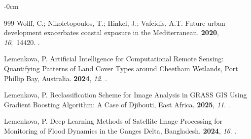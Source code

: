 \documentclass[coasts,article,accept,pdftex,moreauthors]{Definitions/mdpi}
\begin{document}
\begin{adjustwidth}{-\extralength}{0cm}
\begin{thebibliography}{999}
Wolff, C.; Nikoletopoulos, T.; Hinkel, J.; Vafeidis, A.T.
\newblock Future urban development exacerbates coastal exposure in the
  {Mediterranean}.
 {\bf 2020}, {\em 10},~14420.
.

Lemenkova, P.
\newblock Artificial Intelligence for Computational Remote Sensing: Quantifying
  Patterns of Land Cover Types around Cheetham Wetlands, Port Phillip Bay,
  Australia.
 {\bf 2024}, {\em 12}.
.

Lemenkova, P.
\newblock Reclassification Scheme for Image Analysis in GRASS GIS Using
  Gradient Boosting Algorithm: A Case of Djibouti, East Africa.
 {\bf 2025}, {\em 11}.
.

Lemenkova, P.
\newblock Deep Learning Methods of Satellite Image Processing for Monitoring of
  Flood Dynamics in the Ganges Delta, Bangladesh.
 {\bf 2024}, {\em 16}.
.

\end{thebibliography}
\end{adjustwidth}
\end{document}
